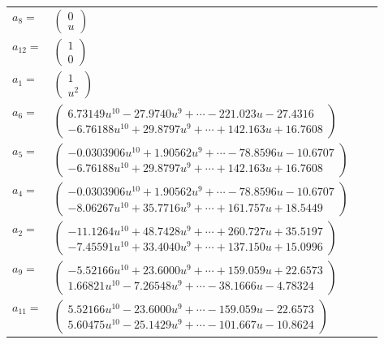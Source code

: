 \documentclass[1p]{elsarticle_modified}
\theoremstyle{definition}
\begin{document}
\begin{tabular}{m{7pt} m{180pt} m{7pt} m{180pt} }
\flushright $a_{8}=$&$\begin{pmatrix}0\\u\end{pmatrix}$ \\
\flushright $a_{12}=$&$\begin{pmatrix}1\\0\end{pmatrix}$ \\
\flushright $a_{1}=$&$\begin{pmatrix}1\\u^2\end{pmatrix}$ \\
\flushright $a_{6}=$&$\begin{pmatrix}6.73149 u^{10}-27.9740 u^{9}+\cdots-221.023 u-27.4316\\-6.76188 u^{10}+29.8797 u^{9}+\cdots+142.163 u+16.7608\end{pmatrix}$ \\
\flushright $a_{5}=$&$\begin{pmatrix}-0.0303906 u^{10}+1.90562 u^{9}+\cdots-78.8596 u-10.6707\\-6.76188 u^{10}+29.8797 u^{9}+\cdots+142.163 u+16.7608\end{pmatrix}$ \\
\flushright $a_{4}=$&$\begin{pmatrix}-0.0303906 u^{10}+1.90562 u^{9}+\cdots-78.8596 u-10.6707\\-8.06267 u^{10}+35.7716 u^{9}+\cdots+161.757 u+18.5449\end{pmatrix}$ \\
\flushright $a_{2}=$&$\begin{pmatrix}-11.1264 u^{10}+48.7428 u^{9}+\cdots+260.727 u+35.5197\\-7.45591 u^{10}+33.4040 u^{9}+\cdots+137.150 u+15.0996\end{pmatrix}$ \\
\flushright $a_{9}=$&$\begin{pmatrix}-5.52166 u^{10}+23.6000 u^{9}+\cdots+159.059 u+22.6573\\1.66821 u^{10}-7.26548 u^{9}+\cdots-38.1666 u-4.78324\end{pmatrix}$ \\
\flushright $a_{11}=$&$\begin{pmatrix}5.52166 u^{10}-23.6000 u^{9}+\cdots-159.059 u-22.6573\\5.60475 u^{10}-25.1429 u^{9}+\cdots-101.667 u-10.8624\end{pmatrix}$ \\

\end{tabular}
\end{document}
